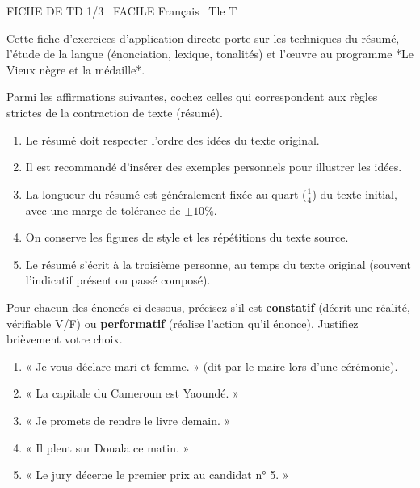 \documentclass[11pt]{article}
\begin{document}
\begin{tcolorbox}[enhanced,colback=popink,colframe=popink,arc=10pt,boxrule=0pt,left=12pt,right=12pt,top=9pt,bottom=9pt]
{\color{white}\popxbold\small FICHE DE TD 1/3 \textbullet\ FACILE \hfill Français \textbullet\ Tle T\par}
\end{tcolorbox}
\vspace{4pt}
Cette fiche d'exercices d'application directe porte sur les techniques du résumé, l'étude de la langue (énonciation, lexique, tonalités) et l'œuvre au programme *Le Vieux nègre et la médaille*.

\begin{exercice}
Parmi les affirmations suivantes, cochez celles qui correspondent aux règles strictes de la contraction de texte (résumé).
\begin{enumerate}
    \item Le résumé doit respecter l'ordre des idées du texte original.
    \item Il est recommandé d'insérer des exemples personnels pour illustrer les idées.
    \item La longueur du résumé est généralement fixée au quart ($\frac{1}{4}$) du texte initial, avec une marge de tolérance de $\pm 10\%$.
    \item On conserve les figures de style et les répétitions du texte source.
    \item Le résumé s'écrit à la troisième personne, au temps du texte original (souvent l'indicatif présent ou passé composé).
\end{enumerate}
\end{exercice}

\begin{exercice}
Pour chacun des énoncés ci-dessous, précisez s'il est \textbf{constatif} (décrit une réalité, vérifiable V/F) ou \textbf{performatif} (réalise l'action qu'il énonce). Justifiez brièvement votre choix.
\begin{enumerate}
    \item « Je vous déclare mari et femme. » (dit par le maire lors d'une cérémonie).
    \item « La capitale du Cameroun est Yaoundé. »
    \item « Je promets de rendre le livre demain. »
    \item « Il pleut sur Douala ce matin. »
    \item « Le jury décerne le premier prix au candidat n° 5. »
\end{enumerate}
\end{exercice}
\end{document}
